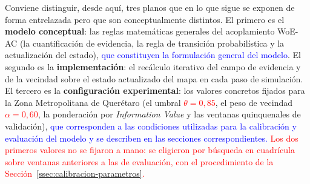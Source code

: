 Conviene distinguir, desde aquí, tres planos que en lo que sigue se exponen de
forma entrelazada pero que son conceptualmente distintos. El primero es el
\textbf{modelo conceptual}: las reglas matemáticas generales del acoplamiento
WoE-AC (la cuantificación de evidencia, la regla de transición probabilística
y la actualización del estado), \textcolor{blue}{que constituyen la formulación
general del modelo}. El segundo es la \textbf{implementación}: el recálculo
iterativo del campo de evidencia y de la vecindad sobre el estado actualizado
del mapa en cada paso de simulación. El tercero es la \textbf{configuración
experimental}: los valores concretos fijados para la Zona Metropolitana de
Querétaro (el umbral \textcolor{red}{$\theta = 0{,}85$}, el peso de vecindad \textcolor{red}{$\alpha = 0{,}60$},
la ponderación por \textit{Information Value} y las ventanas quinquenales de
validación), \textcolor{blue}{que corresponden a las condiciones utilizadas
para la calibración y evaluación del modelo y se describen en las secciones
correspondientes.} \textcolor{red}{Los dos primeros valores no se fijaron a
mano: se eligieron por búsqueda en cuadrícula sobre ventanas anteriores a las
de evaluación, con el procedimiento de la
Sección~\ref{ssec:calibracion-parametros}.}





